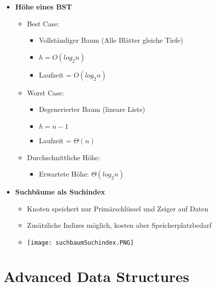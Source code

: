 \begin{itemize}
        \item \textbf{Höhe eines BST}
            \begin{itemize}
                \item Best Case:
                    \begin{itemize}
                        \item Vollständiger Baum (Alle Blätter gleiche Tiefe)
                        \item $h = O(log_2 n)$
                        \item Laufzeit = $O(log_2 n)$
                    \end{itemize}
                \item Worst Case:
                    \begin{itemize}
                        \item Degenerierter Baum (lineare Liste)
                        \item $h = n - 1$
                        \item Laufzeit = $\Theta(n)$
                    \end{itemize}
                \item Durchschnittliche Höhe:
                    \begin{itemize}
                        \item Erwartete Höhe: $\Theta(log_2 n)$
                    \end{itemize}
            \end{itemize}

        \item \textbf{Suchbäume als Suchindex}
            \begin{itemize}
                \item Knoten speichert nur Primärschlüssel und Zeiger auf Daten
                \item Zusätzliche Indizes möglich, kosten aber Speicherplatzbedarf
                \item[] \texttt{[image: suchbaumSuchindex.PNG]}
            \end{itemize}
    \end{itemize}

\section{Advanced Data Structures}
